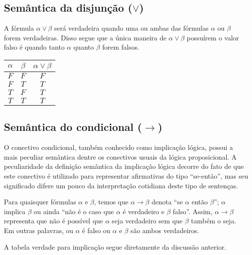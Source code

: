 \subsection{Sem\^antica da disjun\c{c}\~ao ($\lor$)}

A f\'ormula $\alpha\lor\beta$ ser\'a verdadeira quando uma ou ambas
das f\'ormulas $\alpha$ ou $\beta$ forem verdadeiras. Disso segue que
a \'unica maneira de $\alpha\lor\beta$ possu\'irem o valor falso \'e
quando tanto $\alpha$ quanto $\beta$ forem falsos. 

\begin{table}[h]
  \begin{tabular}{|c|c|c|}
    \hline
    $\alpha$ & $\beta$ & $\alpha \lor \beta$\\ \hline
    $F$         & $F$        & $F$ \\ \hline
    $F$         & $T$        & $T$ \\ \hline
    $T$         & $F$        & $T$ \\ \hline
    $T$         & $T$        & $T$ \\ \hline
   \end{tabular}
  \centering
\end{table}

\subsection{Sem\^antica do condicional ($\to$)}

O conectivo condicional, tamb\'em conhecido como implica\c{c}\~ao
l\'ogica, possui a mais peculiar sem\^antica dentre os conectivos
usuais da l\'ogica proposicional. A peculiaridade da defini\c{c}\~ao
sem\^antica da implica\c{c}\~ao l\'ogica decorre do fato de que este
conectivo \'e utilizado para representar afirmativas do tipo
``se-ent\~ao'', mas seu significado difere um pouco da
interpreta\c{c}\~ao cotidiana deste tipo de senten\c{c}as.

Para quaisquer f\'ormulas $\alpha$ e $\beta$, temos que
$\alpha\to\beta$ denota ``se $\alpha$ ent\~ao $\beta$''; $\alpha$
implica $\beta$ ou ainda ``n\~ao \'e o caso que $\alpha$ \'e
verdadeiro e $\beta$ falso''. Assim, $\alpha\to\beta$ representa que
n\~ao \'e poss\'ivel que $\alpha$ seja verdadeiro sem que $\beta$
tamb\'em o seja. Em outras palavras, ou $\alpha$ \'e falso ou $\alpha$
e $\beta$ s\~ao ambos verdadeiros. 

A tabela verdade para
implica\c{c}\~ao segue diretamente da discuss\~ao anterior. 

